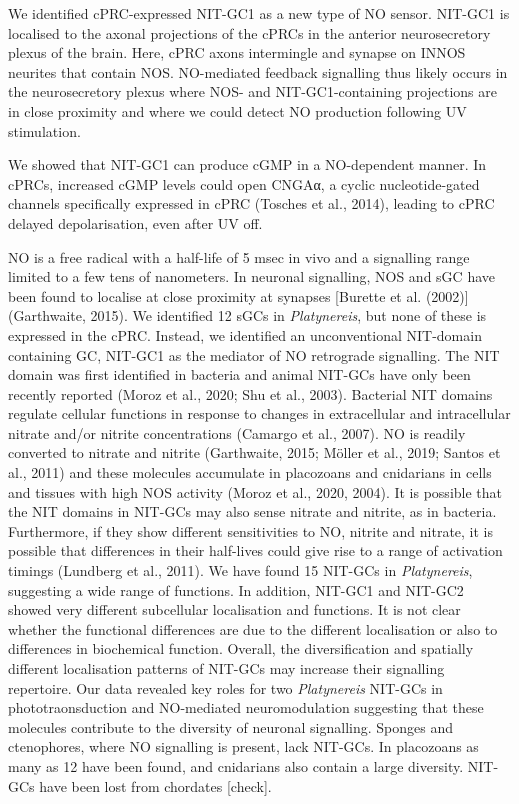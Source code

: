 \documentclass[
  10pt,
  onecolumn]{article}
\begin{document}
We identified cPRC-expressed NIT-GC1 as a new type of NO sensor. NIT-GC1
is localised to the axonal projections of the cPRCs in the anterior
neurosecretory plexus of the brain. Here, cPRC axons intermingle and
synapse on INNOS neurites that contain NOS. NO-mediated feedback
signalling thus likely occurs in the neurosecretory plexus where NOS-
and NIT-GC1-containing projections are in close proximity and where we
could detect NO production following UV stimulation.

We showed that NIT-GC1 can produce cGMP in a NO-dependent manner. In
cPRCs, increased cGMP levels could open CNGAα, a cyclic nucleotide-gated
channels specifically expressed in cPRC (Tosches et al., 2014), leading
to cPRC delayed depolarisation, even after UV off.

NO is a free radical with a half-life of 5 msec in vivo and a signalling
range limited to a few tens of nanometers. In neuronal signalling, NOS
and sGC have been found to localise at close proximity at synapses
{[}Burette et al. (2002){]}(Garthwaite, 2015). We identified 12 sGCs in
\emph{Platynereis}, but none of these is expressed in the cPRC. Instead,
we identified an unconventional NIT-domain containing GC, NIT-GC1 as the
mediator of NO retrograde signalling. The NIT domain was first
identified in bacteria and animal NIT-GCs have only been recently
reported (Moroz et al., 2020; Shu et al., 2003). Bacterial NIT domains
regulate cellular functions in response to changes in extracellular and
intracellular nitrate and/or nitrite concentrations (Camargo et al.,
2007). NO is readily converted to nitrate and nitrite (Garthwaite, 2015;
Möller et al., 2019; Santos et al., 2011) and these molecules accumulate
in placozoans and cnidarians in cells and tissues with high NOS activity
(Moroz et al., 2020, 2004). It is possible that the NIT domains in
NIT-GCs may also sense nitrate and nitrite, as in bacteria. Furthermore,
if they show different sensitivities to NO, nitrite and nitrate, it is
possible that differences in their half-lives could give rise to a range
of activation timings (Lundberg et al., 2011). We have found 15 NIT-GCs
in \emph{Platynereis}, suggesting a wide range of functions. In
addition, NIT-GC1 and NIT-GC2 showed very different subcellular
localisation and functions. It is not clear whether the functional
differences are due to the different localisation or also to differences
in biochemical function. Overall, the diversification and spatially
different localisation patterns of NIT-GCs may increase their signalling
repertoire. Our data revealed key roles for two \emph{Platynereis}
NIT-GCs in phototraonsduction and NO-mediated neuromodulation suggesting
that these molecules contribute to the diversity of neuronal signalling.
Sponges and ctenophores, where NO signalling is present, lack NIT-GCs.
In placozoans as many as 12 have been found, and cnidarians also contain
a large diversity. NIT-GCs have been lost from chordates {[}check{]}.
\end{document}
